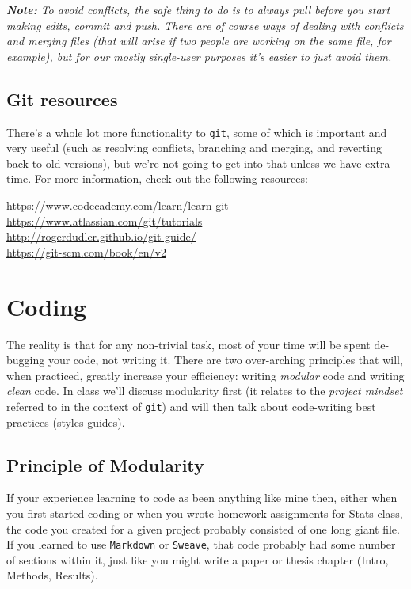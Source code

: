 \documentclass[12pt,letterpaper]{article}
\begin{document}
\emph{ \textbf{Note:}  To avoid conflicts, the safe thing to do is to always pull before you start making edits, commit and push.  There are of course ways of dealing with conflicts and merging files (that will arise if two people are working on the same file, for example), but for our mostly single-user purposes it's easier to just avoid them.}


\subsection{Git resources}
There's a whole lot more functionality to \texttt{git}, some of which is important and very useful (such as resolving conflicts, branching and merging, and reverting back to old versions), but we're not going to get into that unless we have extra time.  For more information, check out the following resources:

\url{https://www.codecademy.com/learn/learn-git}\\
\url{https://www.atlassian.com/git/tutorials}\\
\url{http://rogerdudler.github.io/git-guide/}\\
\url{https://git-scm.com/book/en/v2}



\pagebreak


\section{Coding}
The reality is that for any non-trivial task, most of your time will be spent de-bugging your code, not writing it.  There are two over-arching principles that will, when practiced, greatly increase your efficiency:  writing \emph{modular} code and writing \emph{clean} code.  In class we'll discuss modularity first (it relates to the \emph{project mindset} referred to in the context of \texttt{git}) and will then talk about code-writing best practices (styles guides).

\subsection{Principle of Modularity}
If your experience learning to code as been anything like mine then, either when you first started coding or when you wrote homework assignments for Stats class, the code you created for a given project probably consisted of one long giant file.  If you learned to use \texttt{Markdown} or \texttt{Sweave}, that code probably had some number of sections within it, just like you might write a paper or thesis chapter (Intro, Methods, Results).  
\end{document}
